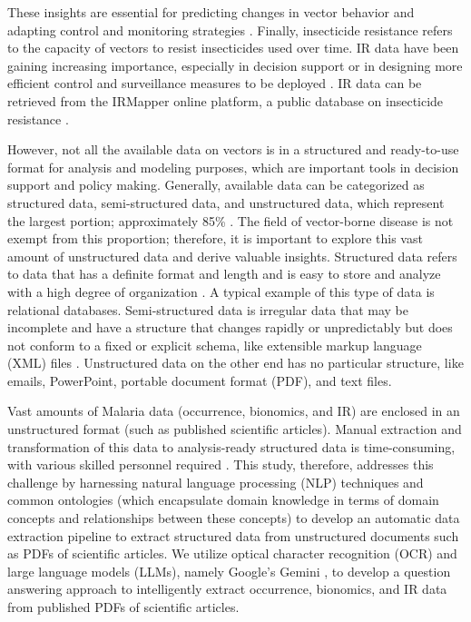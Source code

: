 \documentclass{article}
\begin{document}
These insights are essential for predicting changes in vector behavior and adapting control and monitoring strategies \citep{2024.MA.MVB, 2024.BR.ROD, 2024.DE.SDR}. Finally, insecticide resistance refers to the capacity of vectors to resist insecticides used over time. 
IR data have been gaining increasing importance, especially in decision support or in designing more efficient control and surveillance measures to be deployed \citep{2024.EA.IAC, 2024.AI.MIR, 2024.AI.IOT}. 
IR data can be retrieved from the IRMapper online platform, a public database on insecticide resistance \citep{2014.TB.AOT}. 
\par	
However, not all the available data on vectors is in a structured and ready-to-use format for analysis and modeling purposes, which are important tools in decision support and policy making. 
Generally, available data can be categorized as structured data, semi-structured data, and unstructured data, which represent the largest portion; approximately 85\%  \citep{2016.AC.UDA}. 
The field of vector-borne disease is not exempt from this proportion; therefore, it is important to explore this vast amount of unstructured data and derive valuable insights. 
Structured data refers to data that has a definite format and length and is easy to store and analyze with a high degree of organization \citep{2016.AC.UDA, 2024.YI.MIG}. 
A typical example of this type of data is relational databases. 
Semi-structured data is irregular data that may be incomplete and have a structure that changes rapidly or unpredictably but does not conform to a fixed or explicit schema, like extensible markup language (XML) files \citep{2016.AC.UDA, 2024.DA.ESI}. 
Unstructured data on the other end has no particular structure, like emails, PowerPoint, portable document format (PDF), and text files. 
\par
Vast amounts of Malaria data (occurrence, bionomics, and IR) are enclosed in an unstructured format (such as published scientific articles). 
Manual extraction and transformation of this data to analysis-ready structured data is time-consuming, with various skilled personnel required \citep{2012.ME.AGM, 2010.ME.TDA, 2016.NC.AGB}. 
This study, therefore, addresses this challenge by harnessing natural language processing (NLP) techniques and common ontologies (which encapsulate domain knowledge in terms of domain concepts and relationships between these concepts) to develop an automatic data extraction pipeline to extract structured data from unstructured documents such as PDFs of 
scientific articles. 
We utilize optical character recognition (OCR) and large language models (LLMs), namely Google's Gemini \citep{2024.GE.G1U}, to develop a question answering approach to intelligently extract occurrence, bionomics, and IR data from published PDFs of scientific articles. 
\end{document}
